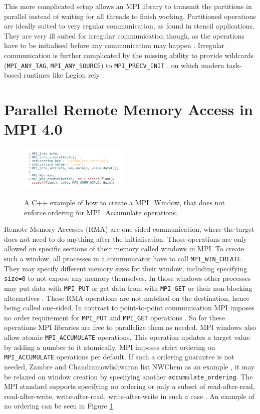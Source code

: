 \documentclass[sigconf]{acmart}
\begin{document}
This more complicated setup allows an MPI library to transmit the partitions in parallel instead of waiting for all threads to finish working.
Partitioned operations are ideally suited to very regular communication, as found in stencil applications.
They are very ill suited for irregular communication though, as the operations have to be initialised before any communication may happen \cite{zambreLessonsLearned2022}.
Irregular communication is further complicated by the missing ability to provide wildcards (\verb|MPI_ANY_TAG|, \verb|MPI_ANY_SOURCE|) to \verb|MPI_PRECV_INIT| \cite{mpi40}, on which modern task-based runtimes like Legion rely \cite{zambreLessonsLearned2022}.


\section{Parallel Remote Memory Access in MPI 4.0}

\begin{figure}
    \caption{
        A C++ example of how to create a MPI\_Window, that does not enforce ordering for MPI\_Accumulate operations.
    }
    \includegraphics[width=0.47\textwidth]{RMANoOrdering.png}
    \label{fig:RMANoOrdering_CPP}
\end{figure}

Remote Memory Accesses (RMA) are one sided communication, where the target does not need to do anything after the initialisation.
Those operations are only allowed on specific sections of their memory called windows in MPI.
To create such a window, all processes in a communicator have to call \verb|MPI_WIN_CREATE|.
They may specify different memory sizes for their window, including specifying \verb|size=0| to not expose any memory themselves.
In those windows other processes may put data with \verb|MPI_PUT| or get data from with \verb|MPI_GET| or their non-blocking alternatives \cite{mpi40}.
These RMA operations are not matched on the destination, hence being called one-sided.
In contrast to point-to-point communication MPI imposes no order requirement for \verb|MPI_PUT| and \verb|MPI_GET| operations \cite{mpi40}.
So for these operations MPI libraries are free to parallelize them as needed.
MPI windows also allow atomic \verb|MPI_ACCUMULATE| operations.
This operation updates a target value by adding a number to it atomically.
MPI imposes strict ordering on \verb|MPI_ACCUMULATE| operations per default.
If such a ordering guarantee is not needed, Zambre and Chandramowlishwaran list NWChem as an example \cite{zambreLessonsLearned2022}, it may be relaxed on window creation by specifying another \verb|accumulate_ordering|.
The MPI standard supports specifying no ordering or only a subset of read-after-read, read-after-write, write-after-read, write-after-write in such a case \cite{mpi40}.
An example of no ordering can be seen in Figure \ref{fig:RMANoOrdering_CPP}.
\end{document}
